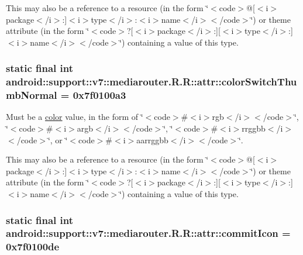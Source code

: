This may also be a reference to a resource (in the form \char`\"{}$<$code$>$@\mbox{[}$<$i$>$package$<$/i$>$:\mbox{]}$<$i$>$type$<$/i$>$:$<$i$>$name$<$/i$>$$<$/code$>$\char`\"{}) or theme attribute (in the form \char`\"{}$<$code$>$?\mbox{[}$<$i$>$package$<$/i$>$:\mbox{]}\mbox{[}$<$i$>$type$<$/i$>$:\mbox{]}$<$i$>$name$<$/i$>$$<$/code$>$\char`\"{}) containing a value of this type. \hypertarget{classandroid_1_1support_1_1v7_1_1mediarouter_1_1_r_1_1attr_8e421cab8dcff2cae574cf21eb47fb66}{
\subsubsection[{colorSwitchThumbNormal}]{\setlength{\rightskip}{0pt plus 5cm}static final int android::support::v7::mediarouter.R.R::attr::colorSwitchThumbNormal = 0x7f0100a3}}
\label{classandroid_1_1support_1_1v7_1_1mediarouter_1_1_r_1_1attr_8e421cab8dcff2cae574cf21eb47fb66}


Must be a \hyperlink{classandroid_1_1support_1_1v7_1_1mediarouter_1_1_r_1_1color}{color} value, in the form of \char`\"{}$<$code$>$\#$<$i$>$rgb$<$/i$>$$<$/code$>$\char`\"{}, \char`\"{}$<$code$>$\#$<$i$>$argb$<$/i$>$$<$/code$>$\char`\"{}, \char`\"{}$<$code$>$\#$<$i$>$rrggbb$<$/i$>$$<$/code$>$\char`\"{}, or \char`\"{}$<$code$>$\#$<$i$>$aarrggbb$<$/i$>$$<$/code$>$\char`\"{}. 

This may also be a reference to a resource (in the form \char`\"{}$<$code$>$@\mbox{[}$<$i$>$package$<$/i$>$:\mbox{]}$<$i$>$type$<$/i$>$:$<$i$>$name$<$/i$>$$<$/code$>$\char`\"{}) or theme attribute (in the form \char`\"{}$<$code$>$?\mbox{[}$<$i$>$package$<$/i$>$:\mbox{]}\mbox{[}$<$i$>$type$<$/i$>$:\mbox{]}$<$i$>$name$<$/i$>$$<$/code$>$\char`\"{}) containing a value of this type. \hypertarget{classandroid_1_1support_1_1v7_1_1mediarouter_1_1_r_1_1attr_45396c5983715ea1141ca8673682b4dc}{
\subsubsection[{commitIcon}]{\setlength{\rightskip}{0pt plus 5cm}static final int android::support::v7::mediarouter.R.R::attr::commitIcon = 0x7f0100de}}
\label{classandroid_1_1support_1_1v7_1_1mediarouter_1_1_r_1_1attr_45396c5983715ea1141ca8673682b4dc}


